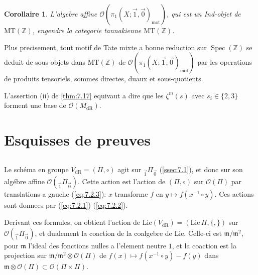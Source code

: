 \documentclass[11pt,a4paper]{article}
\theoremstyle{plain}
\newtheorem{corollary}[theorem]{Corollaire}
\theoremstyle{definition}
\DeclareMathOperator{\Spec}{Spec}
\newcommand{\Z}{\mathbb{Z}}
\newcommand{\dR}{\mathrm{dR}}
\newcommand{\mot}{\mathrm{mot}}
\newcommand{\MT}{\mathrm{MT}}
\begin{document}
\begin{corollary}\label{thm:7.18}
L'algebre affine $\mathcal{O}(\pi_1(X;\vec{1},\vec{0})_{\mot})$, qui est un Ind-objet de $\MT(\Z)$, engendre la categorie tannakienne $\MT(\Z)$.
\end{corollary}

Plus precisement, tout motif de Tate mixte a bonne reduction sur $\Spec(\Z)$ se deduit de sous-objets dans $\MT(\Z)$ de $\mathcal{O}(\pi_1(X;\vec{1},\vec{0})_{\mot})$ par les operations de produits tensoriels, sommes directes, duaux et sous-quotients.

L'assertion (ii) de \ref{thm:7.17} equivaut a dire que les $\zeta^m(s)$ avec $s_i \in \{2,3\}$ forment une base de $\mathcal{O}(M_{\dR})$.

\section{Esquisses de preuves}\label{sec:8}

\subsection{}\label{ssec:8.1}

Le sch\'ema en groupe $V_{\dR} = (\Pi, \circ)$ agit sur ${}_{\vec{1}}\Pi_{\vec{0}}$ (\ref{ssec:7.1}), et donc sur son alg\'ebre affine $\mathcal{O}({}_{\vec{1}}\Pi_{\vec{0}})$. Cette action est l'action de $(\Pi, \circ)$ sur $\mathcal{O}(\Pi)$ par translations a gauche (\ref{eq:7.2.3}): $x$ transforme $f$ en $y \mapsto f(x^{-1} \circ y)$. Ces actions sont donnees par (\ref{eq:7.2.1}) (\ref{eq:7.2.2}).

Derivant ces formules, on obtient l'action de $\mathrm{Lie}(V_{\dR}) = (\mathrm{Lie}\,\Pi, \{,\})$ sur $\mathcal{O}({}_{\vec{1}}\Pi_{\vec{0}})$, et dualement la coaction de la coalgebre de Lie. Celle-ci est $\mathfrak{m}/\mathfrak{m}^2$, pour $\mathfrak{m}$ l'ideal des fonctions nulles a l'element neutre $1$, et la coaction est la projection sur $\mathfrak{m}/\mathfrak{m}^2 \otimes \mathcal{O}(\Pi)$ de $f(x) \mapsto f(x^{-1} \circ y) - f(y)$ dans $\mathfrak{m} \otimes \mathcal{O}(\Pi) \subset \mathcal{O}(\Pi \times \Pi)$.
\end{document}
